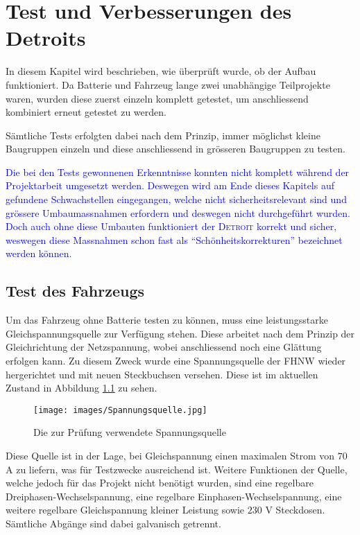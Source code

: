 \chapter{Test und Verbesserungen des Detroits}
In diesem Kapitel wird beschrieben, wie überprüft wurde, ob der Aufbau funktioniert. Da Batterie und Fahrzeug lange zwei unabhängige Teilprojekte waren, wurden diese zuerst einzeln komplett getestet, um anschliessend kombiniert erneut getestet zu werden.

Sämtliche Tests erfolgten dabei nach dem Prinzip, immer möglichst kleine Baugruppen einzeln und diese anschliessend in grösseren Baugruppen zu testen.

\textcolor{blue}{Die bei den Tests gewonnenen Erkenntnisse konnten nicht komplett während der Projektarbeit umgesetzt werden. Deswegen wird am Ende dieses Kapitels auf gefundene Schwachstellen eingegangen, welche nicht sicherheitsrelevant sind und grössere Umbaumassnahmen erfordern und deswegen nicht durchgeführt wurden. Doch auch ohne diese Umbauten funktioniert der \textsc{Detroit} korrekt und sicher, weswegen diese Massnahmen schon fast als "`Schönheitskorrekturen"' bezeichnet werden können.}

\section{Test des Fahrzeugs}
Um das Fahrzeug ohne Batterie testen zu können, muss eine leistungsstarke Gleichspannungsquelle zur Verfügung stehen. Diese arbeitet nach dem Prinzip der Gleichrichtung der Netzspannung, wobei anschliessend noch eine Glättung erfolgen kann. Zu diesem Zweck wurde eine Spannungsquelle der FHNW wieder hergerichtet und mit neuen Steckbuchsen versehen. Diese ist im aktuellen Zustand in Abbildung \ref{fig:Spannungsquelle_blau} zu sehen.

\begin{figure}[h]
	\centering
		\texttt{[image: images/Spannungsquelle.jpg]}
	\caption{Die zur Prüfung verwendete Spannungsquelle}
	\label{fig:Spannungsquelle_blau}
\end{figure}

Diese Quelle ist in der Lage, bei Gleichspannung einen maximalen Strom von $70$ A zu liefern, was für Testzwecke ausreichend ist. Weitere Funktionen der Quelle, welche jedoch für das Projekt nicht benötigt wurden, sind eine regelbare Dreiphasen-Wechselspannung, eine regelbare Einphasen-Wechselspannung, eine weitere regelbare Gleichspannung kleiner Leistung sowie $230$ V Steckdosen. Sämtliche Abgänge sind dabei galvanisch getrennt.

